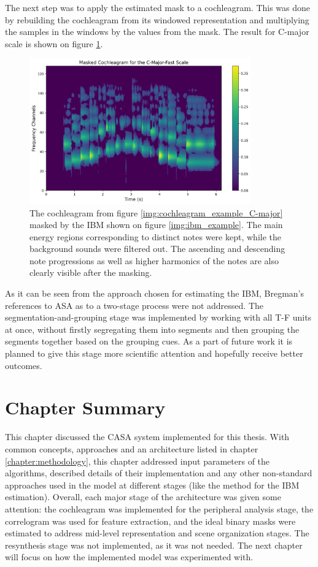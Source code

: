 The next step was to apply the estimated mask to a cochleagram. This was done by rebuilding the cochleagram from its windowed representation and multiplying the samples in the windows by the values from the mask. The result for C-major scale is shown on figure \ref{img:masked_cochleagram_example}.\pagebreak

\begin{figure}[t]
	\centering
	\includegraphics[width=0.85\textwidth]{include/masked_cochleagram_example}
	\caption[A masked cochleagram for C-major scale]{The cochleagram from figure \ref{img:cochleagram_example_C-major} masked by the IBM shown on figure \ref{img:ibm_example}. The main energy regions corresponding to distinct notes were kept, while the background sounds were filtered out. The ascending and descending note progressions as well as higher harmonics of the notes are also clearly visible after the masking.}
	\label{img:masked_cochleagram_example}
\end{figure}

As it can be seen from the approach chosen for estimating the IBM, Bregman's references to ASA as to a two-stage process were not addressed. The segmentation-and-grouping stage was implemented by working with all T-F units at once, without firstly segregating them into segments and then grouping the segments together based on the grouping cues. As a part of future work it is planned to give this stage more scientific attention and hopefully receive better outcomes.

\section{Chapter Summary}

This chapter discussed the CASA system implemented for this thesis. With common concepts, approaches and an architecture listed in chapter \ref{chapter:methodology}, this chapter addressed input parameters of the algorithms, described details of their implementation and any other non-standard approaches used in the model at different stages (like the method for the IBM estimation). Overall, each major stage of the architecture was given some attention: the cochleagram was implemented for the peripheral analysis stage, the correlogram was used for feature extraction, and the ideal binary masks were estimated to address mid-level representation and scene organization stages. The resynthesis stage was not implemented, as it was not needed. The next chapter will focus on how the implemented model was experimented with.


